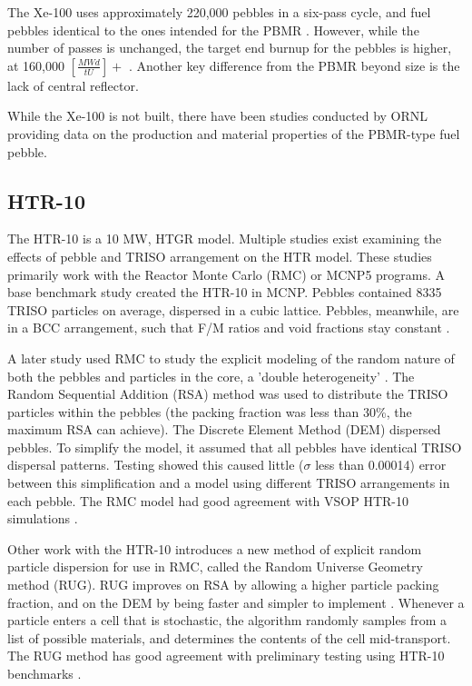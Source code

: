 The Xe-100 uses approximately 220,000 pebbles in a six-pass cycle, and fuel pebbles identical to the ones intended for the PBMR \cite{harlan_x-energy_2018}.  However, while the number of passes is unchanged, the target end burnup for the pebbles is higher, at 160,000 $\left[\frac{MWd}{tU}\right]+$ \cite{agnihotri_intrinsically_2017}.  Another key difference from the PBMR beyond size is the lack of central reflector.

While the Xe-100 is not built, there have been studies conducted by ORNL providing data on the production and material properties of the PBMR-type fuel pebble.

\subsection{HTR-10}

The HTR-10 is a 10 MW, HTGR model.  Multiple studies exist examining the effects of pebble and TRISO arrangement on the HTR model.  These studies primarily work with the Reactor Monte Carlo (RMC) or MCNP5 programs.  A base benchmark study created the HTR-10 in MCNP.  Pebbles contained 8335 TRISO particles on average, dispersed in a cubic lattice.  Pebbles, meanwhile, are in a BCC arrangement, such that F/M ratios and void fractions stay constant \cite{kim_monte_2005}.

A later study used RMC to study the explicit modeling of the random nature of both the pebbles and particles in the core, a 'double heterogeneity' \cite{ she_explicit_nodate}.  The Random Sequential Addition (RSA) method was used to distribute the TRISO particles within the pebbles (the packing fraction was less than 30\%, the maximum RSA can achieve).  The Discrete Element Method (DEM) dispersed pebbles.  To simplify the model, it assumed that all pebbles have identical TRISO dispersal patterns.  Testing showed this caused little ($\sigma$ less than 0.00014) error between this simplification and a model using different TRISO arrangements in each pebble.  The RMC model had good agreement with VSOP HTR-10 simulations \cite{ she_explicit_nodate}.

Other work with the HTR-10 introduces a new method of explicit random particle dispersion for use in RMC, called the Random Universe Geometry method (RUG).  RUG improves on RSA by allowing a higher particle packing fraction, and on the DEM by being faster and simpler to implement \cite{liu_random_2018}.  Whenever a particle enters a cell that is stochastic, the algorithm randomly samples from a list of possible materials, and determines the contents of the cell mid-transport.  The RUG method has good agreement with preliminary testing using HTR-10 benchmarks \cite{liu_random_2018}.



